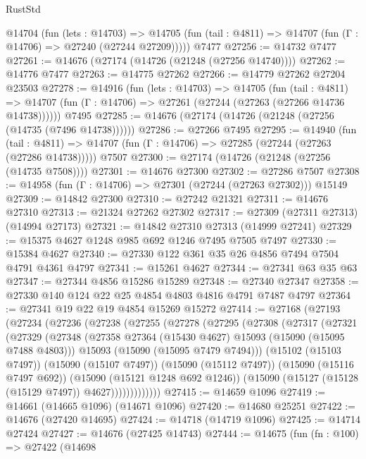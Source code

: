 \begin{lexlean}{RustStd}
\begin{coremodule}
    @14704
      (fun (lets : @14703) =>
      @14705 (fun (tail : @4811) => @14707 (fun (Γ : @14706) => @27240 (@27244 @27209)))))
    @7477
@27256 := @14732 @7477
@27261 := @14676 (@27174 (@14726 (@21248 (@27256 @14740))))
@27262 := @14776 @7477
@27263 := @14775 @27262
@27266 := @14779 @27262 @27204 @23503
@27278 := @14916
    (fun (lets : @14703) =>
    @14705
      (fun (tail : @4811) =>
      @14707 (fun (Γ : @14706) => @27261 (@27244 (@27263 (@27266 @14736 @14738))))))
    @7495
@27285 := @14676 (@27174 (@14726 (@21248 (@27256 (@14735 (@7496 @14738))))))
@27286 := @27266 @7495
@27295 := @14940
    (fun (tail : @4811) => @14707 (fun (Γ : @14706) => @27285 (@27244 (@27263 (@27286 @14738)))))
    @7507
@27300 := @27174 (@14726 (@21248 (@27256 (@14735 @7508))))
@27301 := @14676 @27300
@27302 := @27286 @7507
@27308 := @14958 (fun (Γ : @14706) => @27301 (@27244 (@27263 @27302))) @15149
@27309 := @14842 @27300
@27310 := @27242 @21321
@27311 := @14676 @27310
@27313 := @21324 @27262 @27302
@27317 := @27309 (@27311 @27313) (@14994 @27173)
@27321 := @14842 @27310 @27313 (@14999 @27241)
@27329 := @15375 @4627 @1248 @985 @692 @1246 @7495 @7505 @7497
@27330 := @15384 @4627
@27340 := @27330 @122 @361 @35 @26 @4856 @7494 @7504 @4791 @4361 @4797
@27341 := @15261 @4627
@27344 := @27341 @63 @35 @63
@27347 := @27344 @4856 @15286 @15289
@27348 := @27340 @27347
@27358 := @27330 @140 @124 @22 @25 @4854 @4803 @4816 @4791 @7487 @4797
@27364 := @27341 @19 @22 @19 @4854 @15269 @15272
@27414 := @27168
    (@27193
      (@27234
        (@27236
          (@27238
            (@27255
              (@27278
                (@27295
                  (@27308
                    (@27317
                      (@27321
                        (@27329
                          (@27348
                            (@27358 @27364 (@15430 @4627) @15093 (@15090 (@15095 @7488 @4803)))
                            @15093
                            (@15090 (@15095 @7479 @7494)))
                          (@15102 (@15103 @7497))
                          (@15090 (@15107 @7497))
                          (@15090 (@15112 @7497))
                          (@15090 (@15116 @7497 @692))
                          (@15090 (@15121 @1248 @692 @1246))
                          (@15090 (@15127 (@15128 (@15129 @7497)) @4627)))))))))))))
@27415 := @14659 @1096
@27419 := @14661 (@14665 @1096) (@14671 @1096)
@27420 := @14680 @25251
@27422 := @14676 (@27420 @14695)
@27424 := @14718 (@14719 @1096)
@27425 := @14714 @27424
@27427 := @14676 (@27425 @14743)
@27444 := @14675
    (fun (fn : @100) =>
    @27422
      (@14698

\end{coremodule}
\end{lexlean}
